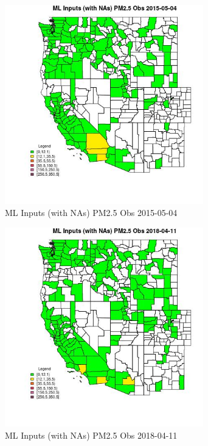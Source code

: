 \begin{figure} 
\centering  
\includegraphics[width=0.77\textwidth]{Code_Outputs/Report_ML_input_PM25_Step4_part_e_de_duplicated_aves_compiled_2019-05-18wNAs_CountyPM25_ObsMean2015-05-04.jpg} 
\caption{\label{fig:Report_ML_input_PM25_Step4_part_e_de_duplicated_aves_compiled_2019-05-18wNAsCountyPM25_ObsMean2015-05-04}ML Inputs (with NAs) PM2.5 Obs 2015-05-04} 
\end{figure} 
 

\begin{figure} 
\centering  
\includegraphics[width=0.77\textwidth]{Code_Outputs/Report_ML_input_PM25_Step4_part_e_de_duplicated_aves_compiled_2019-05-18wNAs_CountyPM25_ObsMean2018-04-11.jpg} 
\caption{\label{fig:Report_ML_input_PM25_Step4_part_e_de_duplicated_aves_compiled_2019-05-18wNAsCountyPM25_ObsMean2018-04-11}ML Inputs (with NAs) PM2.5 Obs 2018-04-11} 
\end{figure} 
 

